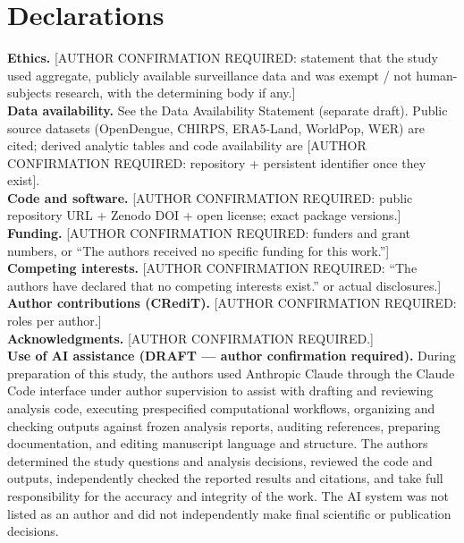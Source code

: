 \documentclass[11pt,a4paper]{article}
\begin{document}
\section*{Declarations}
\textbf{Ethics.} [AUTHOR CONFIRMATION REQUIRED: statement that the study used aggregate, publicly available surveillance data and was exempt / not human-subjects research, with the determining body if any.]\\
\textbf{Data availability.} See the Data Availability Statement (separate draft). Public source datasets (OpenDengue, CHIRPS, ERA5-Land, WorldPop, WER) are cited; derived analytic tables and code availability are [AUTHOR CONFIRMATION REQUIRED: repository + persistent identifier once they exist].\\
\textbf{Code and software.} [AUTHOR CONFIRMATION REQUIRED: public repository URL + Zenodo DOI + open license; exact package versions.]\\
\textbf{Funding.} [AUTHOR CONFIRMATION REQUIRED: funders and grant numbers, or ``The authors received no specific funding for this work.'']\\
\textbf{Competing interests.} [AUTHOR CONFIRMATION REQUIRED: ``The authors have declared that no competing interests exist.'' or actual disclosures.]\\
\textbf{Author contributions (CRediT).} [AUTHOR CONFIRMATION REQUIRED: roles per author.]\\
\textbf{Acknowledgments.} [AUTHOR CONFIRMATION REQUIRED.]\\
\textbf{Use of AI assistance (DRAFT --- author confirmation required).} During preparation of this study, the authors used Anthropic Claude through the Claude Code interface under author supervision to assist with drafting and reviewing analysis code, executing prespecified computational workflows, organizing and checking outputs against frozen analysis reports, auditing references, preparing documentation, and editing manuscript language and structure. The authors determined the study questions and analysis decisions, reviewed the code and outputs, independently checked the reported results and citations, and take full responsibility for the accuracy and integrity of the work. The AI system was not listed as an author and did not independently make final scientific or publication decisions.
\end{document}
